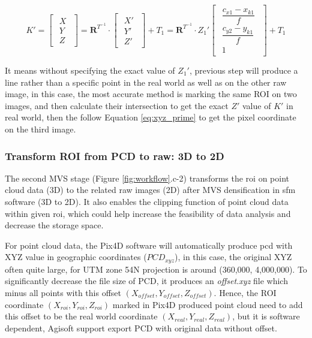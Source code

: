 \documentclass{configs/bmcart}
\begin{document}
$$
  K' = 
  \begin{bmatrix}
    \begin{matrix}
      X \\ Y \\ Z
    \end{matrix}
  \end{bmatrix} 
  = 
  \mathbf{R}^{T^{-1}} \cdot 
  \begin{bmatrix}
    \begin{matrix}
      X' \\ Y' \\ Z'
    \end{matrix}
  \end{bmatrix} + T_1
  =
  \mathbf{R}^{T^{-1}} \cdot Z_1'
  \begin{bmatrix}
    \begin{matrix}
      \dfrac{c_{x1}- x_{k1}}{f} \\ \dfrac{c_{y2} - y_{k1}}{f} \\ 1
    \end{matrix}
  \end{bmatrix} + T_1
$$

It means without specifying the exact value of $Z_1'$, previous step will produce a line rather than a specific point in the real world as well as on the other raw image, in this case, the most accurate method is marking the same ROI on two images, and then calculate their intersection to get the exact $Z'$ value of $K'$ in real world, then the follow Equation \ref{eq:xyz_prime} to get the pixel coordinate on the third image. 

\subsubsection*{Transform ROI from PCD to raw: 3D to 2D}
The second MVS stage (Figure \ref{fig:workflow}.c-2) transforms the \acrfull*{roi} on point cloud data (3D) to the related raw images (2D) after MVS densification in \acrlong*{sfm} software (3D to 2D). It also enables the clipping function of point cloud data within given \acrshort*{roi}, which could help increase the feasibility of data analysis and decrease the storage space.

For point cloud data, the Pix4D software will automatically produce \acrfull*{pcd} with XYZ value in geographic coordinates ($PCD_{xyz}$), in this case, the original XYZ often quite large, for UTM zone 54N projection is around (360,000, 4,000,000). To significantly decrease the file size of PCD, it produces an \textit{offset.xyz} file which minus all points with this offset $(X_{offset}, Y_{offset}, Z_{offset})$. Hence, the ROI coordinate $(X_{roi}, Y_{roi}, Z_{roi})$ marked in Pix4D produced point cloud need to add this offset to be the real world coordinate $(X_{real}, Y_{real}, Z_{real})$, but it is software dependent, Agisoft support export PCD with original data without offset.
\end{document}
